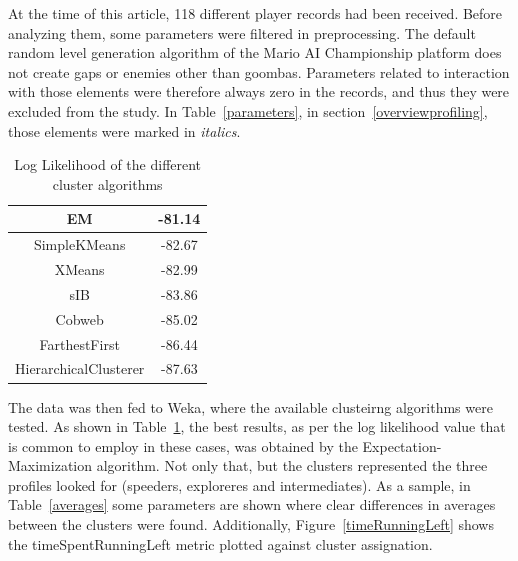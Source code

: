 \documentclass[conference]{IEEEtran}
\begin{document}
At the time of this article, 118 different player records had been received. Before analyzing them, some parameters were filtered in preprocessing. The default random level generation algorithm of the Mario AI Championship platform does not create gaps or enemies other than goombas. Parameters related to interaction with those elements were therefore always zero in the records, and thus they were excluded from the study. In Table~\ref{parameters}, in section~\ref{overviewprofiling}, those elements were marked in \textit{italics}.

	\begin{table}
	\begin{center}
	\renewcommand{\arraystretch}{1.3}
	\caption{Log Likelihood of the different cluster algorithms}
	\label{loglikelihood}
	\begin{tabular}{|c|c|}
	\hline
	EM & -81.14 \\
	\hline
	SimpleKMeans & -82.67 \\
	\hline
	XMeans & -82.99 \\
	\hline
	sIB & -83.86 \\
	\hline
	Cobweb & -85.02 \\
	\hline
	FarthestFirst & -86.44 \\
	\hline
	HierarchicalClusterer & -87.63 \\
	\hline
	\end{tabular}
	\end{center}
	\end{table}

The data was then fed to Weka, where the available clusteirng algorithms were tested. As shown in Table~\ref{loglikelihood}, the best results, as per the log likelihood value that is common to employ in these cases, was obtained by the Expectation-Maximization algorithm. Not only that, but the clusters represented the three profiles looked for (speeders, exploreres and intermediates). As a sample, in Table~\ref{averages} some parameters are shown where clear differences in averages between the clusters were found. Additionally, Figure~\ref{timeRunningLeft} shows the timeSpentRunningLeft metric plotted against cluster assignation.
\end{document}
